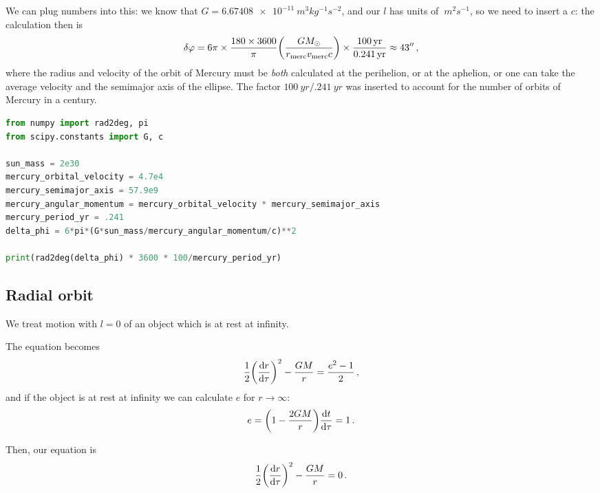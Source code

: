 \documentclass[main.tex]{subfiles}
\begin{document}
We can plug numbers into this: we know that \(G = \SI{6.67408e-11}{m^3 kg^{-1} s^{-2}}\), and our \(l\) has units of \(\SI{}{m^2s^{-1}}\), so we need to insert a \(c\): the calculation then is 
%
\begin{align}
  \delta \varphi = 6 \pi \times \frac{180 \times 3600}{\pi }  \qty(\frac{G M_{\odot}}{r _{\text{merc}} v _{\text{merc}} c}) \times \frac{\SI{100}{yr}}{\SI{.241}{yr}} \approx 43''
\,,
\end{align}
%
where the radius and velocity of the orbit of Mercury must be \emph{both} calculated at the perihelion, or at the aphelion, or one can take the average velocity and the semimajor axis of the ellipse. 
The factor \(\SI{100}{yr} / \SI{.241}{yr}\) was inserted to account for the number of orbits of Mercury in a century.

\begin{lstlisting}[language=Python]
from numpy import rad2deg, pi
from scipy.constants import G, c

sun_mass = 2e30
mercury_orbital_velocity = 4.7e4
mercury_semimajor_axis = 57.9e9
mercury_angular_momentum = mercury_orbital_velocity * mercury_semimajor_axis
mercury_period_yr = .241
delta_phi = 6*pi*(G*sun_mass/mercury_angular_momentum/c)**2

print(rad2deg(delta_phi) * 3600 * 100/mercury_period_yr)

\end{lstlisting}


\subsection{Radial orbit}

We treat motion with \(l=0\) of an object which is at rest at infinity. 

The equation becomes 
%
\begin{align}
  \frac{1}{2} \qty(\dv{r}{\tau })^2 - \frac{GM}{r} = \frac{e^2 - 1}{2}
\,,
\end{align}
%
and if the object is at rest at infinity we can calculate \(e\) for \(r \rightarrow \infty\): 
%
\begin{align}
  e = \qty(1 - \frac{2GM}{r}) \dv{t}{\tau } = 1
\,. 
\end{align}

Then, our equation is 
%
\begin{align}
\frac{1}{2} \qty(\dv{r}{\tau })^2 - \frac{GM}{r} =0
\,. 
\end{align}
%
\end{document}
